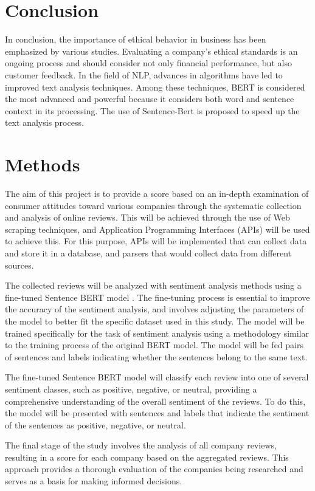 \documentclass[PI]{ProjectProposal}
\begin{document}
\section{Conclusion}
\label{sec:org5c10729}
In conclusion, the importance of ethical behavior in business has been emphasized by various studies. Evaluating a company's ethical standards is an ongoing process and should consider not only financial performance, but also customer feedback. In the field of NLP, advances in algorithms have led to improved text analysis techniques. Among these techniques, BERT is considered the most advanced and powerful because it considers both word and sentence context in its processing. The use of Sentence-Bert is proposed to speed up the text analysis process.
\section{Methods}
\label{sec:orgd2548eb}
The aim of this project is to provide a score based on an in-depth examination of consumer attitudes toward various companies through the systematic collection and analysis of online reviews. This will be achieved through the use of Web scraping techniques, and Application Programming Interfaces (APIs) will be used to achieve this. For this purpose, APIs will be implemented that can collect data and store it in a database, and parsers that would collect data from different sources.

The collected reviews will be analyzed with sentiment analysis methods using a fine-tuned Sentence BERT model \autocite{reimers-2019-sentence-bert}. The fine-tuning process is essential to improve the accuracy of the sentiment analysis, and involves adjusting the parameters of the model to better fit the specific dataset used in this study. The model will be trained specifically for the task of sentiment analysis using a methodology similar to the training process of the original BERT model. The model will be fed pairs of sentences and labels indicating whether the sentences belong to the same text.

The fine-tuned Sentence BERT model will classify each review into one of several sentiment classes, such as positive, negative, or neutral, providing a comprehensive understanding of the overall sentiment of the reviews. To do this, the model will be presented with sentences and labels that indicate the sentiment of the sentences as positive, negative, or neutral.

The final stage of the study involves the analysis of all company reviews, resulting in a score for each company based on the aggregated reviews. This approach provides a thorough evaluation of the companies being researched and serves as a basis for making informed decisions.
\end{document}
